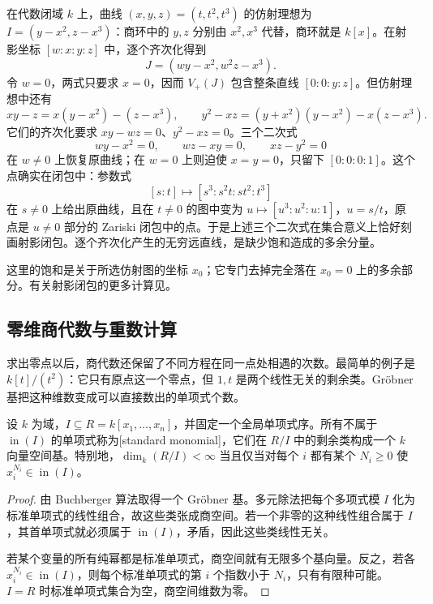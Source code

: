 \begin{example}\label{g5:exm:spurious-infinity-component}
	在代数闭域 \(k\) 上，曲线 \((x,y,z)=(t,t^2,t^3)\) 的仿射理想为 \(I=(y-x^2,z-x^3)\)：商环中的 \(y,z\) 分别由 \(x^2,x^3\) 代替，商环就是 \(k[x]\)。在射影坐标 \([w:x:y:z]\) 中，逐个齐次化得到
	\[
		J=(wy-x^2,w^2z-x^3).
	\]
	令 \(w=0\)，两式只要求 \(x=0\)，因而 \(V_+(J)\) 包含整条直线 \([0:0:y:z]\)。但仿射理想中还有
	\[
		xy-z=x(y-x^2)-(z-x^3),\qquad
		y^2-xz=(y+x^2)(y-x^2)-x(z-x^3).
	\]
	它们的齐次化要求 \(xy-wz=0\)、\(y^2-xz=0\)。三个二次式
	\[
		wy-x^2=0,\qquad wz-xy=0,\qquad xz-y^2=0
	\]
	在 \(w\ne0\) 上恢复原曲线；在 \(w=0\) 上则迫使 \(x=y=0\)，只留下 \([0:0:0:1]\)。这个点确实在闭包中：参数式
	\[
		[s:t]\longmapsto[s^3:s^2t:st^2:t^3]
	\]
	在 \(s\ne0\) 上给出原曲线，且在 \(t\ne0\) 的图中变为 \(u\mapsto[u^3:u^2:u:1]\)，\(u=s/t\)，原点是 \(u\ne0\) 部分的 Zariski 闭包中的点。于是上述三个二次式在集合意义上恰好刻画射影闭包。逐个齐次化产生的无穷远直线，是缺少饱和造成的多余分量。
\end{example}

这里的饱和是关于所选仿射图的坐标 \(x_0\)；它专门去掉完全落在 \(x_0=0\) 上的多余部分。有关射影闭包的更多计算见\cite[第8章第4节]{CoxLittleOShea2015}。

\subsection{零维商代数与重数计算}
\label{g5:subsec:0104:05}
求出零点以后，商代数还保留了不同方程在同一点处相遇的次数。最简单的例子是 \(k[t]/(t^2)\)：它只有原点这一个零点，但 \(1,t\) 是两个线性无关的剩余类。Gröbner 基把这种维数变成可以直接数出的单项式个数。

\begin{proposition}\label{g5:prop:standard-monomials}
	设 \(k\) 为域，\(I\subseteq R=k[x_1,\ldots,x_n]\)，并固定一个全局单项式序。所有不属于 \(\operatorname{in}(I)\) 的单项式称为[standard monomial]，它们在 \(R/I\) 中的剩余类构成一个 \(k\) 向量空间基。特别地，\(\dim_k(R/I)<\infty\) 当且仅当对每个 \(i\) 都有某个 \(N_i\ge0\) 使 \(x_i^{N_i}\in\operatorname{in}(I)\)。
\end{proposition}
\begin{proof}
	由 Buchberger 算法取得一个 Gröbner 基。多元除法把每个多项式模 \(I\) 化为标准单项式的线性组合，故这些类张成商空间。若一个非零的这种线性组合属于 \(I\)，其首单项式就必须属于 \(\operatorname{in}(I)\)，矛盾，因此这些类线性无关。

	若某个变量的所有纯幂都是标准单项式，商空间就有无限多个基向量。反之，若各 \(x_i^{N_i}\in\operatorname{in}(I)\)，则每个标准单项式的第 \(i\) 个指数小于 \(N_i\)，只有有限种可能。\(I=R\) 时标准单项式集合为空，商空间维数为零。
\end{proof}

